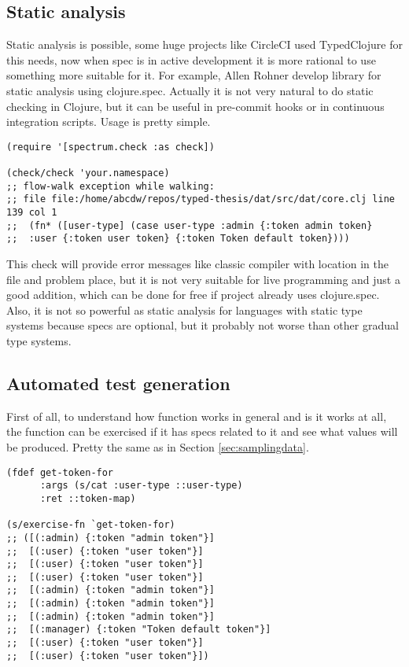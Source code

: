 \subsection{Static analysis}
Static analysis is possible, some huge projects like CircleCI used TypedClojure
for this needs, now when spec is in active development it is more rational to
use something more suitable for it. For example, Allen Rohner develop library
for static analysis using clojure.spec. Actually it is not very natural to do
static checking in Clojure, but it can be useful in pre-commit hooks or in
continuous integration scripts. Usage is pretty simple.

\begin{verbatim}
(require '[spectrum.check :as check])

(check/check 'your.namespace)
;; flow-walk exception while walking:
;; file file:/home/abcdw/repos/typed-thesis/dat/src/dat/core.clj line 139 col 1
;;  (fn* ([user-type] (case user-type :admin {:token admin token}
;;  :user {:token user token} {:token Token default token})))
\end{verbatim}

This check will provide error messages like classic compiler with location in
the file and problem place, but it is not very suitable for live programming and
just a good addition, which can be done for free if project already uses
clojure.spec. Also, it is not so powerful as static analysis for languages with
static type systems because specs are optional, but it probably not worse than
other gradual type systems.

\subsection{Automated test generation}
First of all, to understand how function works in general and is it works at
all, the function can be exercised if it has specs related to it and see what
values will be produced. Pretty the same as in Section \ref{sec:samplingdata}.

\begin{verbatim}
(fdef get-token-for
      :args (s/cat :user-type ::user-type)
      :ret ::token-map)

(s/exercise-fn `get-token-for)
;; ([(:admin) {:token "admin token"}]
;;  [(:user) {:token "user token"}]
;;  [(:user) {:token "user token"}]
;;  [(:user) {:token "user token"}]
;;  [(:admin) {:token "admin token"}]
;;  [(:admin) {:token "admin token"}]
;;  [(:admin) {:token "admin token"}]
;;  [(:manager) {:token "Token default token"}]
;;  [(:user) {:token "user token"}]
;;  [(:user) {:token "user token"}])
\end{verbatim}

